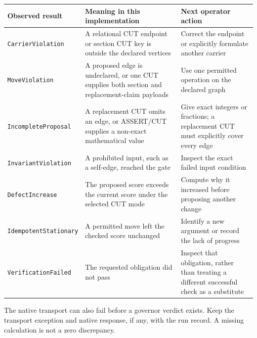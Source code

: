 \documentclass[
  11pt,
]{article}
\begin{document}
\begin{longtable}[]{@{}
  >{\raggedright\arraybackslash}p{}
  >{\raggedright\arraybackslash}p{}
  >{\raggedright\arraybackslash}p{}@{}}
\toprule\noalign{}
\begin{minipage}[b]{\linewidth}\raggedright
Observed result
\end{minipage} & \begin{minipage}[b]{\linewidth}\raggedright
Meaning in this implementation
\end{minipage} & \begin{minipage}[b]{\linewidth}\raggedright
Next operator action
\end{minipage} \\
\midrule\noalign{}
\endhead
\bottomrule\noalign{}
\endlastfoot
\nolinkurl{CarrierViolation} & A relational CUT endpoint or section CUT
key is outside the declared vertices & Correct the endpoint or
explicitly formulate another carrier \\
\nolinkurl{MoveViolation} & A proposed edge is undeclared, or one CUT
supplies both section and replacement-claim payloads & Use one permitted
operation on the declared graph \\
\nolinkurl{IncompleteProposal} & A replacement CUT omits an edge, or
ASSERT/CUT supplies a non-exact mathematical value & Give exact integers
or fractions; a replacement CUT must explicitly cover every edge \\
\nolinkurl{InvariantViolation} & A prohibited input, such as a
self-edge, reached the gate & Inspect the exact failed input
condition \\
\nolinkurl{DefectIncrease} & The proposed score exceeds the current
score under the selected CUT mode & Compute why it increased before
proposing another change \\
\nolinkurl{IdempotentStationary} & A permitted move left the checked
score unchanged & Identify a new argument or record the lack of
progress \\
\nolinkurl{VerificationFailed} & The requested obligation did not pass &
Inspect that obligation, rather than treating a different successful
check as a substitute \\
\end{longtable}

The native transport can also fail before a governor verdict exists.
Keep the transport exception and native response, if any, with the run
record. A missing calculation is not a zero discrepancy.
\end{document}
